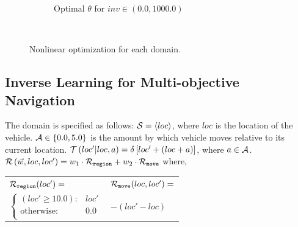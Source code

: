 {\begin{figure}[ht]
\begin{subfigure}{\columnwidth}
                \caption{Optimal {\footnotesize $ \theta $} for {\footnotesize $ inv \in \left(0.0, 1000.0 \right) $}}\label{fig:oe_opt}
            \end{subfigure}\\
        \caption{Nonlinear optimization for each domain.}        
        \label{tab:opt_results}
        \vspace{-3mm}
    \end{figure}
}

\subsection{Inverse Learning for Multi-objective Navigation}
\label{sec:results_navigation}

The domain is specified as follows: {\footnotesize $ \mathcal{S} = \left\langle loc \right\rangle$}, where $ loc $ is the location of the vehicle. {\footnotesize $ \mathcal{A} \in \left\lbrace 0.0, 5.0 \right\rbrace $} is the amount by which vehicle moves relative to its current location. {\footnotesize $ \mathcal{T}\left( loc' | loc, a \right) = \delta \left[ loc' + (loc + a) \right] $}, where {\footnotesize $ a \in \mathcal{A} $}. {\footnotesize $ \mathcal{R}\left(\vec{w}, loc, loc'\right) = w_1 \cdot \mathcal{R}_{\mathtt{region}} + w_2 \cdot \mathcal{R}_{\mathtt{move}} $} where,

{\footnotesize 
    \abovedisplayskip=10pt
    \belowdisplayskip=0pt
    \renewcommand{\arraystretch}{1.5}
    \begin{tabular}{ll}    
        $ \mathcal{R}_{\mathtt{region}}(loc') = $ &  $ \mathcal{R}_{\mathtt{move}}(loc, loc') =  $ \\
        \qquad $ \begin{cases}
        (loc' \geq 10.0 ) : & loc' \\
        \text{otherwise} : & 0.0 \\
        \end{cases} $ & \qquad $ - (loc' - loc)  $\\
    \end{tabular}
} 

